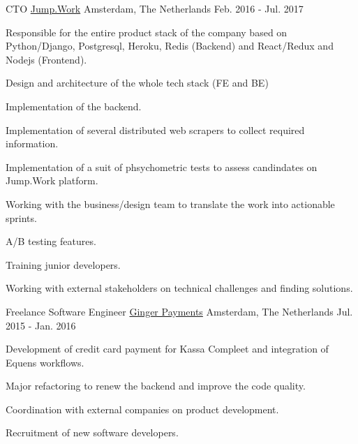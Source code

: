 \begin{cventries}
  \cventry
    {CTO} %
    {\href{https://www.jump.work/}{Jump.Work}} %
    {Amsterdam, The Netherlands} %
    {Feb. 2016 - Jul. 2017} %
    {
      \begin{cvitems} %
        \item {Responsible for the entire product stack of the company based on Python/Django, Postgresql, Heroku, Redis (Backend) and React/Redux and Nodejs (Frontend).}
        \item {Design and architecture of the whole tech stack (FE and BE)}
        \item {Implementation of the backend.}
        \item {Implementation of several distributed web scrapers to collect required information.}
        \item {Implementation of a suit of phsychometric tests to assess candindates on Jump.Work platform.}
        \item {Working with the business/design team to translate the work into actionable sprints.}
        \item {A/B testing features.}
        \item {Training junior developers.}
        \item {Working with external stakeholders on technical challenges and finding solutions.}
      \end{cvitems}
    }

  \cventry
    {Freelance Software Engineer} %
    {\href{https://www.gingerpayments.com}{Ginger Payments}} %
    {Amsterdam, The Netherlands} %
    {Jul. 2015 - Jan. 2016} %
    {
      \begin{cvitems} %
      \item {Development of credit card payment for Kassa Compleet and integration of Equens workflows.}
      \item {Major refactoring to renew the backend and improve the code quality.}
      \item {Coordination with external companies on product development.}
      \item {Recruitment of new software developers.}
      \end{cvitems}
    }



\end{cventries}
